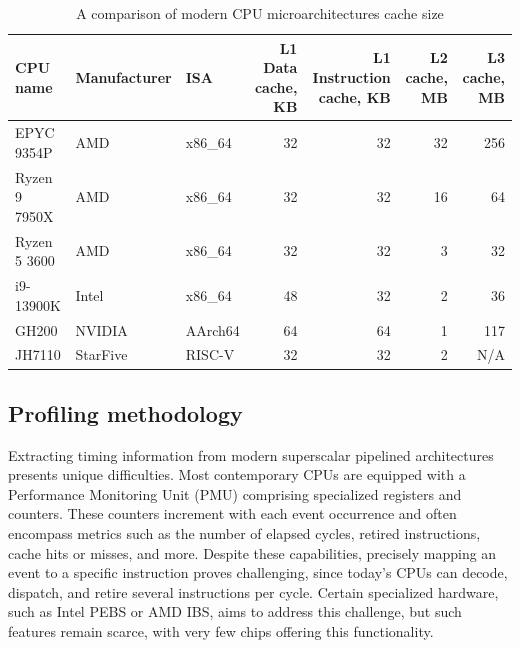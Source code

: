 \begin{table}[!t]
        \renewcommand{\arraystretch}{1.3}
        \caption{A comparison of modern CPU microarchitectures cache size}
        \centering
	\begin{tabular}{lllrrrr}
	        \hline
		CPU name      & Manufacturer & ISA     & L1 Data cache, KB                        & L1 Instruction cache, KB & L2 cache, MB & L3 cache, MB \\
		\hline
		EPYC 9354P    & AMD          & x86\_64 & 32                                       & 32                       & 32           & 256          \\
		Ryzen 9 7950X & AMD          & x86\_64 & 32                                       & 32                       & 16           & 64           \\
		Ryzen 5 3600  & AMD          & x86\_64 & 32                                       & 32                       & 3            & 32           \\
		i9-13900K     & Intel        & x86\_64 & 48                                       & 32                       & 2            & 36           \\
		GH200         & NVIDIA       & AArch64 & 64                                       & 64                       & 1            & 117          \\
		JH7110        & StarFive     & RISC-V  & 32                                       & 32                       & 2            & N/A
	\end{tabular}
        \label{tab:caches}
\end{table}

\subsection{Profiling methodology}

Extracting timing information from modern superscalar pipelined architectures presents unique difficulties.
Most contemporary CPUs are equipped with a Performance Monitoring Unit (PMU) comprising specialized registers
and counters. These counters increment with each event occurrence and often encompass metrics such as the 
number of elapsed cycles, retired instructions, cache hits or misses, and more. Despite these capabilities, 
precisely mapping an event to a specific instruction proves challenging, since today's CPUs can decode, 
dispatch, and retire several instructions per cycle. Certain specialized hardware, such as Intel PEBS or 
AMD IBS, aims to address this challenge, but such features remain scarce, with very few chips offering this 
functionality\cite{bakhvalovPerformanceAnalysisTuning2020}.

